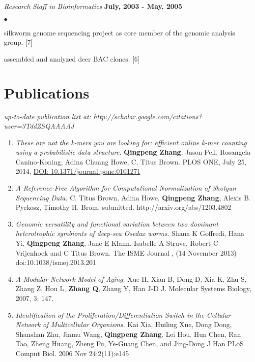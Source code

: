 \documentclass[margin,line]{res}
\newenvironment{list2}{
  \begin{list}{$\bullet$}{%
      \setlength{\itemsep}{0in}
      \setlength{\parsep}{0in} \setlength{\parskip}{0in}
      \setlength{\topsep}{0in} \setlength{\partopsep}{0in} 
      \setlength{\leftmargin}{0.2in}}}{\end{list}}
\begin{document}
\begin{resume}
{\em Research Staff in Bioinformatics} \hfill {\bf July, 2003 - May, 2005}

\begin{list2}

    \item silkworm genome sequencing project as core member of the genomic 
    analysis group. [7]
    \item assembled and analyzed deer BAC clones. [6]
\end{list2}

\section{\sc Publications}

{\em up-to-date publication list at: http://scholar.google.com/citations?user=3TddZSQAAAAJ}\\

\begin{enumerate}

\item {\em These are not the k-mers you are looking for: efficient online 
k-mer counting using a probabilistic data structure.} {\bf Qingpeng Zhang}, Jason Pell, Rosangela Canino-Koning, Adina Chuang Howe, C. 
Titus Brown. PLOS ONE, July 25, 2014, 
\href{http://www.plosone.org/article/info%3Adoi%2F10.1371%2Fjournal.pone.0101271}{DOI: 10.1371/journal.pone.0101271}

\item {\em A Reference-Free Algorithm for Computational Normalization of Shotgun 
Sequencing Data.} C. Titus Brown, Adina Howe, {\bf Qingpeng Zhang}, Alexis B. Pyrkosz, Timothy H. 
Brom.  submitted. http://arxiv.org/abs/1203.4802

\item {\em Genomic versatility and functional variation between two dominant 
heterotrophic symbionts of deep-sea Osedax worms.} Shana K Goffredi, Hana Yi, 
{\bf Qingpeng Zhang}, Jane E Klann, Isabelle A Struve, Robert C Vrijenhoek and 
C Titus Brown. The ISME Journal , (14 November 2013) | 
doi:10.1038/ismej.2013.201

\item {\em A Modular Network Model of Aging.} Xue H, Xian B, Dong D, Xia K, Zhu S, 
Zhang Z, Hou L, {\bf Zhang Q}, Zhang Y, Han J-D J.  Molecular Systems 
Biology, 2007, 3: 147.

\item {\em Identification of the Proliferation/Differentiation Switch in the 
Cellular Network of Multicellular Organisms.} Kai Xia, Huiling 
Xue, Dong Dong, Shanshan Zhu, Jiamu Wang, {\bf Qingpeng Zhang}, 
Lei Hou, Hua Chen, Ran Tao, Zheng Huang, Zheng Fu, Ye-Guang Chen, and 
Jing-Dong J Han PLoS Comput Biol. 2006 Nov 24;2(11):e145


\end{enumerate}
\end{resume}
\end{document}
